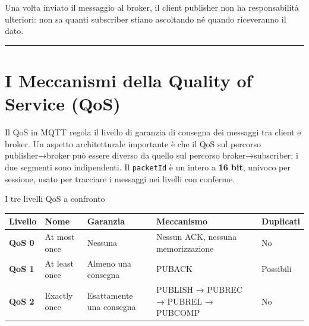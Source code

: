 \documentclass[
  italian,
  openany]{book}
\newcounter{none} %
\begin{document}
Una volta inviato il messaggio al broker, il client publisher non ha
responsabilità ulteriori: non sa quanti subscriber stiano ascoltando né
quando riceveranno il dato.

\begin{center}\rule{0.5\linewidth}{0.5pt}\end{center}

\section{I Meccanismi della Quality of Service
(QoS)}\label{i-meccanismi-della-quality-of-service-qos}

Il QoS in MQTT regola il livello di garanzia di consegna dei messaggi
tra client e broker. Un aspetto architetturale importante è che il QoS
sul percorso publisher→broker può essere diverso da quello sul percorso
broker→subscriber: i due segmenti sono indipendenti. Il
\texttt{packetId} è un intero a \textbf{16 bit}, univoco per sessione,
usato per tracciare i messaggi nei livelli con conferme.

\begin{calloutnote}{I tre livelli QoS a confronto}

{\def\LTcaptype{none} %
\begin{longtable}[]{@{}
  >{\raggedright\arraybackslash}p{}
  >{\raggedright\arraybackslash}p{}
  >{\raggedright\arraybackslash}p{}
  >{\raggedright\arraybackslash}p{}
  >{\raggedright\arraybackslash}p{}@{}}
\toprule\noalign{}
\begin{minipage}[b]{\linewidth}\raggedright
Livello
\end{minipage} & \begin{minipage}[b]{\linewidth}\raggedright
Nome
\end{minipage} & \begin{minipage}[b]{\linewidth}\raggedright
Garanzia
\end{minipage} & \begin{minipage}[b]{\linewidth}\raggedright
Meccanismo
\end{minipage} & \begin{minipage}[b]{\linewidth}\raggedright
Duplicati
\end{minipage} \\
\midrule\noalign{}
\endhead
\bottomrule\noalign{}
\endlastfoot
\textbf{QoS 0} & At most once & Nessuna & Nessun ACK, nessuna
memorizzazione & No \\
\textbf{QoS 1} & At least once & Almeno una consegna & PUBACK &
Possibili \\
\textbf{QoS 2} & Exactly once & Esattamente una consegna & PUBLISH →
PUBREC → PUBREL → PUBCOMP & No \\
\end{longtable}
}

\end{calloutnote}
\end{document}
